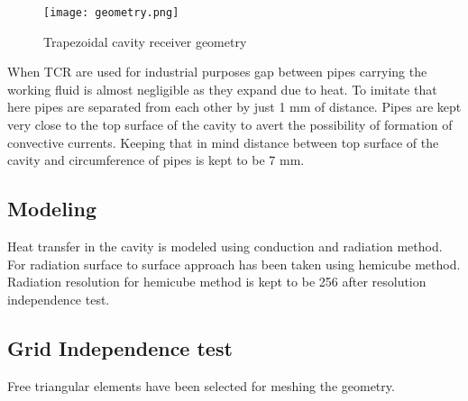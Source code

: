 \begin{figure}[H]
\begin{center}
\texttt{[image: geometry.png]}
\caption{Trapezoidal cavity receiver geometry}
\label{fig:tcrgeo}
\end{center}
\end{figure}


When TCR are used for industrial purposes gap between pipes carrying the working fluid is almost negligible as they expand due to heat. To imitate that here pipes are separated from each other by just 1 mm of distance. Pipes are kept very close to the top surface of the cavity to avert the possibility of formation of convective currents. Keeping that in mind distance between top surface of the cavity and circumference of pipes is kept to be 7 mm. 


\subsection{Modeling}
Heat transfer in the cavity is modeled using conduction and radiation method. For radiation surface to surface approach has been taken using hemicube method. Radiation resolution for hemicube method is kept to be 256 after resolution independence test.

\subsection{Grid Independence test}
Free triangular elements have been selected for meshing the geometry. 
















